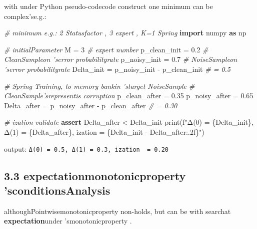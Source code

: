 \documentclass[
  12pt,
]{article}
\newenvironment{Shaded}{}{}
\newcommand{\BuiltInTok}[1]{\textcolor[rgb]{0.00,0.50,0.00}{#1}}
\newcommand{\CommentTok}[1]{\textcolor[rgb]{0.38,0.63,0.69}{\textit{#1}}}
\newcommand{\ControlFlowTok}[1]{\textcolor[rgb]{0.00,0.44,0.13}{\textbf{#1}}}
\newcommand{\DecValTok}[1]{\textcolor[rgb]{0.25,0.63,0.44}{#1}}
\newcommand{\FloatTok}[1]{\textcolor[rgb]{0.25,0.63,0.44}{#1}}
\newcommand{\ImportTok}[1]{\textcolor[rgb]{0.00,0.50,0.00}{\textbf{#1}}}
\newcommand{\NormalTok}[1]{#1}
\newcommand{\OperatorTok}[1]{\textcolor[rgb]{0.40,0.40,0.40}{#1}}
\newcommand{\SpecialCharTok}[1]{\textcolor[rgb]{0.25,0.44,0.63}{#1}}
\newcommand{\SpecialStringTok}[1]{\textcolor[rgb]{0.73,0.40,0.53}{#1}}
\begin{document}
with under  Python pseudo-codecode construct one minimum can be complex'se.g.: 

\begin{Shaded}
\begin{Highlighting}[]
\CommentTok{\# minimum e.g.: 2 Statusfactor , 3 expert , K=1  Spring}
\ImportTok{import}\NormalTok{ numpy }\ImportTok{as}\NormalTok{ np}

\CommentTok{\# initialParameter}
\NormalTok{M }\OperatorTok{=} \DecValTok{3}  \CommentTok{\# expert number }
\NormalTok{p\_clean\_init }\OperatorTok{=} \FloatTok{0.2}   \CommentTok{\# CleanSampleon 'serror probabilityrate }
\NormalTok{p\_noisy\_init }\OperatorTok{=} \FloatTok{0.7}   \CommentTok{\# NoiseSampleon 'serror probabilityrate }
\NormalTok{Delta\_init }\OperatorTok{=}\NormalTok{ p\_noisy\_init }\OperatorTok{{-}}\NormalTok{ p\_clean\_init  }\CommentTok{\# = 0.5}

\CommentTok{\# Spring Training, to memory bankin 'starget NoiseSample}
\CommentTok{\# CleanSample'srepresentis corruption}
\NormalTok{p\_clean\_after }\OperatorTok{=} \FloatTok{0.35}
\NormalTok{p\_noisy\_after }\OperatorTok{=} \FloatTok{0.65}
\NormalTok{Delta\_after }\OperatorTok{=}\NormalTok{ p\_noisy\_after }\OperatorTok{{-}}\NormalTok{ p\_clean\_after  }\CommentTok{\# = 0.30}

\CommentTok{\# ization validate }
\ControlFlowTok{assert}\NormalTok{ Delta\_after }\OperatorTok{\textless{}}\NormalTok{ Delta\_init}
\BuiltInTok{print}\NormalTok{(}\SpecialStringTok{f"Δ(0) = }\SpecialCharTok{\{}\NormalTok{Delta\_init}\SpecialCharTok{\}}\SpecialStringTok{, Δ(1) = }\SpecialCharTok{\{}\NormalTok{Delta\_after}\SpecialCharTok{\}}\SpecialStringTok{, ization  = }\SpecialCharTok{\{}\NormalTok{Delta\_init }\OperatorTok{{-}}\NormalTok{ Delta\_after}\SpecialCharTok{:.2f\}}\SpecialStringTok{"}\NormalTok{)}
\end{Highlighting}
\end{Shaded}

output: \texttt{Δ(0)\ =\ 0.5,\ Δ(1)\ =\ 0.3,\ ization \ =\ 0.20}

\subsection{3.3
expectationmonotonicproperty 'sconditionsAnalysis}\label{ux671fux671bux5355ux8c03ux6027ux7684ux6761ux4ef6ux5206ux6790}

althoughPointwisemonotonicproperty non-holds, but can be with searchat \textbf{expectation}under 'smonotonicproperty . 
\end{document}
